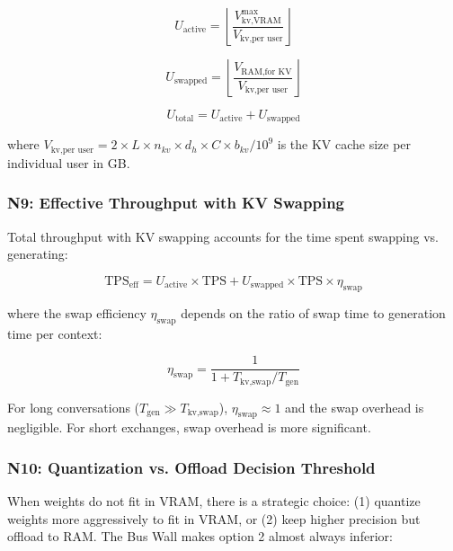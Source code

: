 \documentclass[11pt,a4paper]{article}
\theoremstyle{definition}
\begin{document}
\begin{equation}\label{eq:u_active}
U_{\text{active}} = \left\lfloor \frac{V_{\text{kv,VRAM}}^{\max}}{V_{\text{kv,per user}}} \right\rfloor
\end{equation}

\begin{equation}\label{eq:u_swapped}
U_{\text{swapped}} = \left\lfloor \frac{V_{\text{RAM,for KV}}}{V_{\text{kv,per user}}} \right\rfloor
\end{equation}

\begin{equation}\label{eq:u_total}
U_{\text{total}} = U_{\text{active}} + U_{\text{swapped}}
\end{equation}

where $V_{\text{kv,per user}} = 2 \times L \times n_{kv} \times d_h \times C \times b_{kv} / 10^9$ is the KV cache size per individual user in GB.

\subsubsection{N9: Effective Throughput with KV Swapping}

Total throughput with KV swapping accounts for the time spent swapping vs. generating:

\begin{equation}\label{eq:eff_throughput}
\text{TPS}_{\text{eff}} = U_{\text{active}} \times \text{TPS} + U_{\text{swapped}} \times \text{TPS} \times \eta_{\text{swap}}
\end{equation}

where the swap efficiency $\eta_{\text{swap}}$ depends on the ratio of swap time to generation time per context:

\begin{equation}\label{eq:swap_eff}
\eta_{\text{swap}} = \frac{1}{1 + T_{\text{kv,swap}} / T_{\text{gen}}}
\end{equation}

For long conversations ($T_{\text{gen}} \gg T_{\text{kv,swap}}$), $\eta_{\text{swap}} \approx 1$ and the swap overhead is negligible. For short exchanges, swap overhead is more significant.

\subsubsection{N10: Quantization vs. Offload Decision Threshold}

When weights do not fit in VRAM, there is a strategic choice: (1) quantize weights more aggressively to fit in VRAM, or (2) keep higher precision but offload to RAM. The Bus Wall makes option 2 almost always inferior:
\end{document}
